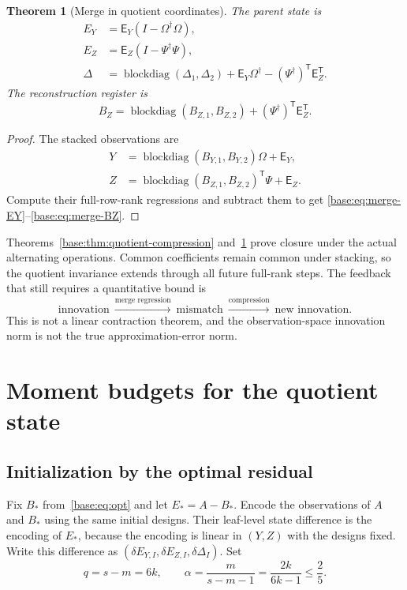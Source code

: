 \documentclass[11pt,oneside,openany,a4paper]{book}
\numberwithin{equation}{chapter}
\newtheorem{theorem}{Theorem}[chapter]
\theoremstyle{definition}
\theoremstyle{remark}
\newcommand{\T}{\mathsf T}\newcommand{\Id}{I}
\DeclareMathOperator{\diag}{blockdiag}\DeclareMathOperator{\range}{range}
\begin{document}
\begin{theorem}[Merge in quotient coordinates]\label{base:thm:quotient-merge}
The parent state is
\begin{align}
 E_Y&=\mathsf E_Y(I-\Omega^\dagger\Omega),\label{base:eq:merge-EY}\\
 E_Z&=\mathsf E_Z(I-\Psi^\dagger\Psi),\label{base:eq:merge-EZ}\\
 \Delta&=\diag(\Delta_1,\Delta_2)
          +\mathsf E_Y\Omega^\dagger
          -(\Psi^\dagger)^{\T}\mathsf E_Z^{\T}.\label{base:eq:merge-Delta}
\end{align}
The reconstruction register is
\begin{equation}\label{base:eq:merge-BZ}
 B_Z=\diag(B_{Z,1},B_{Z,2})+(\Psi^\dagger)^{\T}\mathsf E_Z^{\T}.
\end{equation}
\end{theorem}
\begin{proof}
The stacked observations are
\begin{align*}
 Y&=\diag(B_{Y,1},B_{Y,2})\Omega+\mathsf E_Y,\\
 Z&=\diag(B_{Z,1},B_{Z,2})^{\T}\Psi+\mathsf E_Z.
\end{align*}
Compute their full-row-rank regressions and subtract them to get
\eqref{base:eq:merge-EY}--\eqref{base:eq:merge-BZ}.\end{proof}

Theorems~\ref{base:thm:quotient-compression} and~\ref{base:thm:quotient-merge}
prove closure under the actual alternating operations. Common coefficients
remain common under stacking, so the quotient invariance extends through
all future full-rank steps. The feedback that still requires a quantitative
bound is
\[
 \text{innovation}\ \xrightarrow{\text{merge regression}}\
 \text{mismatch}\ \xrightarrow{\text{compression}}\
 \text{new innovation}.
\]
This is not a linear contraction theorem, and the observation-space
innovation norm is not the true approximation-error norm.

\section{Moment budgets for the quotient state}\label{base:sec:quotient-moments}
\subsection{Initialization by the optimal residual}
Fix $B_*$ from~\eqref{base:eq:opt} and let $E_*=A-B_*$. Encode the observations
of $A$ and $B_*$ using the same initial designs. Their leaf-level state
difference is the encoding of $E_*$, because the encoding is linear in
$(Y,Z)$ with the designs fixed. Write this difference as
$(\delta E_{Y,I},\delta E_{Z,I},\delta\Delta_I)$.
Set
\begin{equation}\label{base:eq:q-alpha}
 q=s-m=6k,\qquad \alpha=\frac{m}{s-m-1}=\frac{2k}{6k-1}\le\frac25.
\end{equation}
\end{document}

